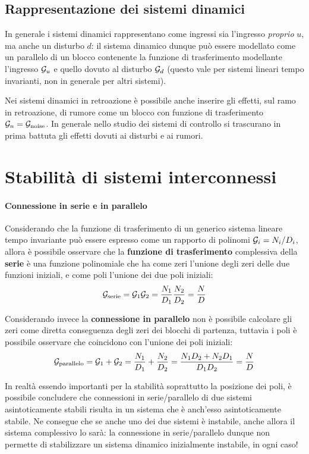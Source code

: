 	\subsection{Rappresentazione dei sistemi dinamici}
		In generale i sistemi dinamici rappresentano come ingressi sia l'ingresso \textit{proprio} $u$, ma anche un disturbo $d$: il sistema dinamico dunque può essere modellato come un parallelo di un blocco contenente la funzione di trasferimento modellante l'ingresso $\mathcal G_u$ e quello dovuto al disturbo $\mathcal G_d$ (questo vale per sistemi lineari tempo invarianti, non in generale per altri sistemi).
		
		Nei sistemi dinamici in retroazione è possibile anche inserire gli effetti, sul ramo in retroazione, di rumore come un blocco con funzione di trasferimento $\mathcal G_n = \mathcal G_\textrm{noise}$. In generale nello studio dei sistemi di controllo si trascurano in prima battuta gli effetti dovuti ai disturbi e ai rumori.
		
		
\section{Stabilità di sistemi interconnessi}
	
	\paragraph{Connessione in serie e in parallelo} Considerando che la funzione di trasferimento di un generico sistema lineare tempo invariante può essere espresso come un rapporto di polinomi $\mathcal G_i = N_i/D_i$, allora è possibile osservare che la \textbf{funzione di trasferimento} complessiva della \textbf{serie}  è una funzione polinomiale che ha come zeri l'unione degli zeri delle due funzioni iniziali, e come poli l'unione dei due poli iniziali:
	\[ \mathcal G_\textrm{serie} = \mathcal G_1 \mathcal G_2 = \frac{N_1}{D_1} \frac{N_2}{D_2} = \frac N D \]
	
	Considerando invece la \textbf{connessione in parallelo} non è possibile calcolare gli zeri come diretta conseguenza degli zeri dei blocchi di partenza, tuttavia i poli è possibile osservare che coincidono con l'unione dei poli iniziali:
	\[ \mathcal G_\textrm{parallelo} = \mathcal G_1 + \mathcal G_2 = \frac{N_1}{D_1} + \frac{N_2}{D_2} = \frac{N_1D_2+N_2D_1}{D_1D_2} = \frac N D  \]
	
	In realtà essendo importanti per la stabilità soprattutto la posizione dei poli, è possibile concludere che connessioni in serie/parallelo di due sistemi asintoticamente stabili risulta in un sistema che è anch'esso asintoticamente stabile. Ne consegue che se anche uno dei due sistemi è instabile, anche allora il sistema complessivo lo sarà: la connessione in serie/parallelo dunque non permette di stabilizzare un sistema dinamico inizialmente instabile, in ogni caso!
	
